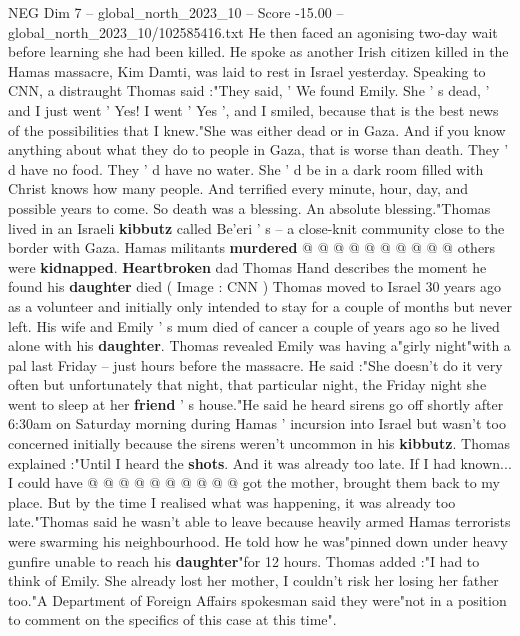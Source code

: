 \begin{textsample}{NEG Dim 7 – global\_north\_2023\_10 – Score -15.00 – global\_north\_2023\_10/102585416.txt}  \label{ex:f7_neg_021}
He then faced an agonising two-day wait before learning she had been killed.
He spoke as another Irish citizen killed in the Hamas massacre, Kim Damti, was laid to rest in Israel yesterday.
Speaking to CNN, a distraught Thomas said :"They said, ' We found Emily.
She ' s dead, ' and I just went ' Yes!
I went ' Yes ', and I smiled, because that is the best news of the possibilities that I knew."She was either dead or in Gaza.
And if you know anything about what they do to people in Gaza, that is worse than death.
They ' d have no food.
They ' d have no water.
She ' d be in a dark room filled with Christ knows how many people.
And terrified every minute, hour, day, and possible years to come.
So death was a blessing.
An absolute blessing."Thomas lived in an Israeli \textbf{kibbutz} called Be'eri ' s -- a close-knit community close to the border with Gaza.
Hamas militants \textbf{murdered} @ @ @ @ @ @ @ @ @ @ others were \textbf{kidnapped}. \textbf{Heartbroken} dad Thomas Hand describes the moment he found his \textbf{daughter} died ( Image : CNN ) Thomas moved to Israel 30 years ago as a volunteer and initially only intended to stay for a couple of months but never left.
His wife and Emily ' s mum died of cancer a couple of years ago so he lived alone with his \textbf{daughter}.
Thomas revealed Emily was having a"girly night"with a pal last Friday -- just hours before the massacre.
He said :"She doesn't do it very often but unfortunately that night, that particular night, the Friday night she went to sleep at her \textbf{friend} ' s house."He said he heard sirens go off shortly after 6:30am on Saturday morning during Hamas ' incursion into Israel but wasn't too concerned initially because the sirens weren't uncommon in his \textbf{kibbutz}.
Thomas explained :"Until I heard the \textbf{shots}.
And it was already too late.
If I had known...
I could have @ @ @ @ @ @ @ @ @ @ got the mother, brought them back to my place.
But by the time I realised what was happening, it was already too late."Thomas said he wasn't able to leave because heavily armed Hamas terrorists were swarming his neighbourhood.
He told how he was"pinned down under heavy gunfire unable to reach his \textbf{daughter}"for 12 hours.
Thomas added :"I had to think of Emily.
She already lost her mother, I couldn't risk her losing her father too."A Department of Foreign Affairs spokesman said they were"not in a position to comment on the specifics of this case at this time".

\end{textsample}
